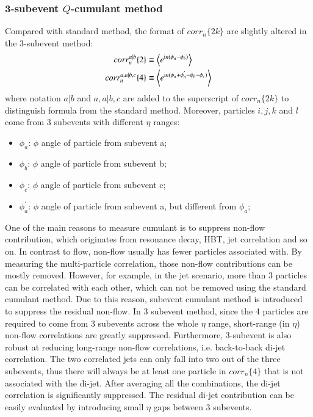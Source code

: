 \subsubsection{3-subevent $Q$-cumulant method}
Compared with standard method, the format of $corr_n\{2k\}$ are slightly altered in the 3-subevent method:
\begin{equation}
\begin{split}
corr_n^{a|b}\{2\}&\equiv \left\langle e^{\text{i}n(\phi_a-\phi_b)}\right\rangle \\
corr_n^{a,a|b,c}\{4\}&\equiv \left\langle e^{\text{i}n(\phi_a+\phi_a^{'}-\phi_b-\phi_c)}\right\rangle
\end{split}
\end{equation}
where notation $a|b$ and $a,a|b,c$ are added to the superscript of $corr_n\{2k\}$ to distinguish formula from the standard method. Moreover, particles $i,j,k$ and $l$ come from 3 subevents with different $\eta$ ranges:
\begin{itemize}
\item $\phi_a$: $\phi$ angle of particle from subevent a;
\item $\phi_b$: $\phi$ angle of particle from subevent b;
\item $\phi_c$: $\phi$ angle of particle from subevent c;
\item $\phi_a^{'}$: $\phi$ angle of particle from subevent a, but different from $\phi_a$;
\end{itemize}
One of the main reasons to measure cumulant is to suppress non-flow contribution, which originates from resonance decay, HBT, jet correlation and so on. In contrast to flow, non-flow usually has fewer particles associated with. By measuring the multi-particle correlation, those non-flow contributions can be mostly removed. However, for example, in the jet scenario, more than 3 particles can be correlated with each other, which can not be removed using the standard cumulant method. Due to this reason, subevent cumulant method is introduced to suppress the residual non-flow. In 3 subevent method, since the 4 particles are required to come from 3 subevents across the whole $\eta$ range, short-range (in $\eta$) non-flow correlations are greatly suppressed. Furthermore, 3-subevent is also robust at reducing long-range non-flow correlations, i.e. back-to-back di-jet correlation. The two correlated jets can only fall into two out of the three subevents, thus there will always be at least one particle in $corr_n\{4\}$ that is not associated with the di-jet. After averaging all the combinations, the di-jet correlation is significantly suppressed. The residual di-jet contribution can be easily evaluated by introducing small $\eta$ gaps between 3 subevents.

